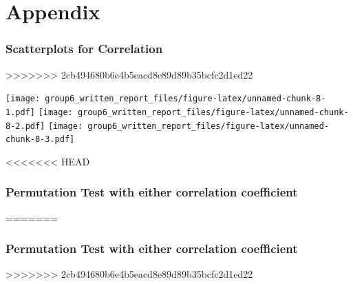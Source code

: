 \documentclass[]{article}
\begin{document}
\section{Appendix}\label{appendix}

\subsubsection{Scatterplots for
Correlation}\label{scatterplots-for-correlation}
>>>>>>> 2cb494680b6e4b5eacd8e89d89b35bcfc2d1ed22

\texttt{[image: group6\_written\_report\_files/figure-latex/unnamed-chunk-8-1.pdf]}
\texttt{[image: group6\_written\_report\_files/figure-latex/unnamed-chunk-8-2.pdf]}
\texttt{[image: group6\_written\_report\_files/figure-latex/unnamed-chunk-8-3.pdf]}

<<<<<<< HEAD
\hypertarget{permutation-test-with-either-correlation-coefficient}{%
\subsubsection{Permutation Test with either correlation
coefficient}\label{permutation-test-with-either-correlation-coefficient}}
=======
\subsubsection{Permutation Test with either correlation
coefficient}\label{permutation-test-with-either-correlation-coefficient}
>>>>>>> 2cb494680b6e4b5eacd8e89d89b35bcfc2d1ed22
\end{document}
